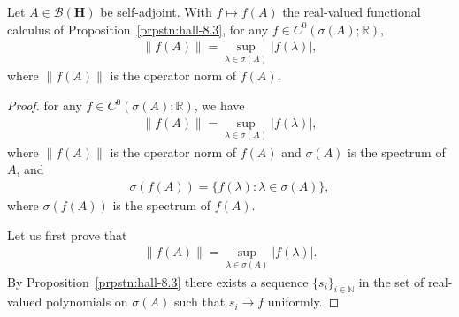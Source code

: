 \begin{proposition}
    \label{prpstn:cfc-norm}
    \leanok
    Let $A \in \mathcal{B}(\mathbf{H})$ be self-adjoint. With $f \mapsto f(A)$ the real-valued functional calculus of Proposition~\ref{prpstn:hall-8.3}, for any $f \in C^0(\sigma(A); \mathbb{R})$,
    \begin{align}
        \|f(A)\| = \sup\limits_{\lambda \in \sigma(A)} \lvert f(\lambda) \rvert,
    \end{align}
    where $\|f(A)\|$ is the operator norm of $f(A)$.
\end{proposition}
\begin{proof}
    \leanok
for any $f \in C^0(\sigma(A); \mathbb{R})$, we have
\begin{align}
    \|f(A)\| = \sup\limits_{\lambda \in \sigma(A)} \lvert f(\lambda) \rvert,
\end{align}
where $\|f(A)\|$ is the operator norm of $f(A)$ and $\sigma(A)$ is the spectrum of $A$, and
\begin{align}
    \sigma(f(A)) = \{ f(\lambda) : \lambda \in \sigma(A) \},
\end{align}
where $\sigma(f(A))$ is the spectrum of $f(A)$.

Let us first prove that
\begin{align}
    \|f(A)\| = \sup\limits_{\lambda \in \sigma(A)} \lvert f(\lambda) \rvert.
\end{align}
By Proposition~\ref{prpstn:hall-8.3} there exists a sequence $\{ s_i \}_{i \in \mathbb{N}}$ in the set of real-valued polynomials on $\sigma(A)$ such that $s_i \rightarrow f$ uniformly.


\end{proof}
